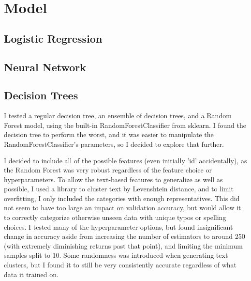 \section{Model}

\subsection{Logistic Regression}

\subsection{Neural Network}

\subsection{Decision Trees}
I tested a regular decision tree, an ensemble of decision trees, and a Random Forest model, using the built-in RandomForestClassifier from sklearn. I found the decision tree to perform the worst, and it was easier to manipulate the RandomForestClassifier’s parameters, so I decided to explore that further.

I decided to include all of the possible features (even initially 'id' accidentally), as the Random Forest was very robust regardless of the feature choice or hyperparameters. To allow the text-based features to generalize as well as possible, I used a library to cluster text by Levenshtein distance, and to limit overfitting, I only included the categories with enough representatives. This did not seem to have too large an impact on validation accuracy, but would allow it to correctly categorize otherwise unseen data with unique typos or spelling choices.
I tested many of the hyperparameter options, but found insignificant change in accuracy aside from increasing the number of estimators to around 250 (with extremely diminishing returns past that point), and limiting the minimum samples split to 10. Some randomness was introduced when generating text clusters, but I found it to still be very consistently accurate regardless of what data it trained on.

